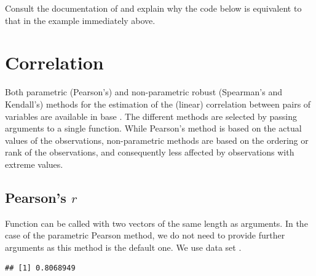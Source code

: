 \documentclass[krantz2]{krantz}\usepackage{knitr}
\begin{document}
\begin{advplayground}
Consult the documentation of  and explain why the code below is equivalent to that in the example immediately above.

\begin{knitrout}\footnotesize
{}\color{fgcolor}\begin{kframe}
\begin{alltt}
\hlstd{cars[}\hlstd{(} \hlstd{=}   \hlstd{=} \hlstd{), ]}
\end{alltt}
\end{kframe}
\end{knitrout}

\end{advplayground}

\section{Correlation}
Both parametric (Pearson's) and non-parametric robust (Spearman's and Kendall's) methods for the estimation of the (linear) correlation between pairs of variables are available in base \Rlang. The different methods are selected by passing arguments to a single function. While Pearson's method is based on the actual values of the observations, non-parametric methods are based on the ordering or rank of the observations, and consequently less affected by observations with extreme values.

\subsection{Pearson's $r$}

Function  can be called with two vectors of the same length as arguments. In the case of the parametric Pearson method, we do not need to provide further arguments as this method is the default one.  We use data set .

\begin{knitrout}\footnotesize
{}\color{fgcolor}\begin{kframe}
\begin{alltt}
\hlstd{(} \hlopt{$}  \hlopt{$}
\end{alltt}
\begin{verbatim}
## [1] 0.8068949
\end{verbatim}
\end{kframe}
\end{knitrout}
\end{document}
